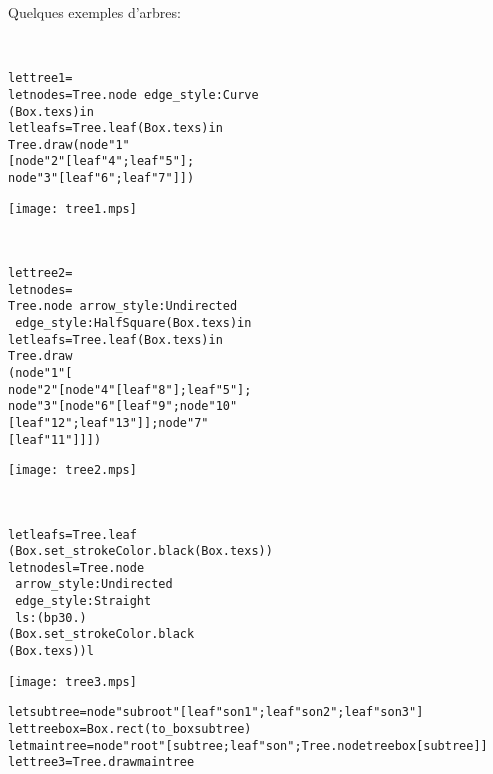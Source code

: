 \documentclass[a4paper,12pt]{article}
\begin{document}
Quelques exemples d'arbres:

~\\

\begin{minipage}{0.5\linewidth}
  \begin{alltt}
    let tree1 =
    let node s = Tree.node ~edge_style:Curve 
    (Box.tex s) in
    let leaf s = Tree.leaf (Box.tex s) in
    Tree.draw (node "1" 
    [node "2" [leaf "4"; leaf "5"]; 
      node "3" [leaf "6"; leaf "7"]])
  \end{alltt}
\end{minipage}
\begin{minipage}{0.5\linewidth}
  \begin{center}
    \texttt{[image: tree1.mps]}
  \end{center}
\end{minipage}

~\\

\begin{minipage}{0.5\linewidth}
  \begin{alltt}
    let tree2 =
    let node s = 
    Tree.node ~arrow_style:Undirected 
    ~edge_style:HalfSquare (Box.tex s) in
    let leaf s = Tree.leaf (Box.tex s) in
    Tree.draw 
    (node "1" [
      node "2" [node "4" [leaf "8"]; leaf "5"]; 
      node "3" [node "6" [leaf "9"; node "10" 
          [leaf "12"; leaf "13"]];node "7" 
        [leaf "11"]]])
  \end{alltt}
\end{minipage}
\begin{minipage}{0.5\linewidth}
  \begin{center}
    \texttt{[image: tree2.mps]}
  \end{center}
\end{minipage}

~\\

\begin{minipage}{0.5\linewidth}
  \begin{alltt}
    let leaf s = Tree.leaf 
    (Box.set_stroke Color.black (Box.tex s))
    let node s l = Tree.node  
    ~arrow_style:Undirected 
    ~edge_style:Straight 
    ~ls:(bp 30.)
    (Box.set_stroke Color.black 
    (Box.tex s)) l
  \end{alltt}
\end{minipage}
\begin{minipage}{0.5\linewidth}
  \begin{center}
    \texttt{[image: tree3.mps]}
  \end{center}
\end{minipage}
\begin{alltt}
  let subtree = node "subroot" [leaf "son1"; leaf "son2"; leaf "son3"]
  let treebox = Box.rect (to_box subtree)
  let maintree = node "root" [subtree; leaf "son"; Tree.node treebox [subtree]]
  let tree3 = Tree.draw maintree 
\end{alltt}
\end{document}
